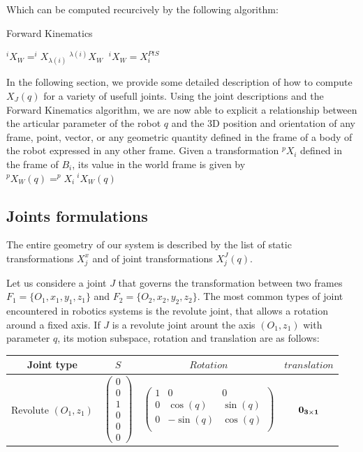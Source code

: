 Which can be computed recurcively by the following algorithm:

\begin{algorithm}
  \caption{Forward Kinematics}
  \label{FK}
\begin{algorithmic}
   $^iX_W = ^iX_{\lambda(i)}\ ^{\lambda(i)}X_W$
  \Else $\ ^iX_W = X^{PtS}_i$
  \EndIf
  \EndFor
\end{algorithmic}
\end{algorithm}

In the following section, we provide some detailed description of how to compute $X_J(q)$ for a variety of usefull joints.
Using the joint descriptions and the Forward Kinematics algorithm, we are now able to explicit a relationship between the articular parameter of the robot $q$ and the 3D position and orientation of any frame, point, vector, or any geometric quantity defined in the frame of a body of the robot expressed in any other frame.
Given a transformation $^pX_i$ defined in the frame of $B_i$, its value in the world frame is given by $^pX_W(q) = ^pX_i\ ^iX_W(q)$

\subsection{Joints formulations}
\label{sub:joints_formulations}

The entire geometry of our system is described by the list of static transformations $X^x_j$ and of joint transformations $X^J_j(q)$.

Let us considere a joint $J$ that governs the transformation between two frames $F_1=\{O_1, x_1, y_1, z_1\}$ and $F_2=\{O_2, x_2, y_2, z_2\}$.
The most common types of joint encountered in robotics systems is the revolute joint, that allows a rotation around a fixed axis.
If $J$ is a revolute joint arount the axis $(O_1,z_1)$ with parameter $q$, its motion subspace, rotation and translation are as follows:

\begin{tabular}{|c|c|c|c|}
  \hline
  Joint type & $S$ & $Rotation$ & $translation$ \\
  \hline
  Revolute $(O_1,z_1)$
  &
  $\begin{pmatrix}
    0 \\ 0 \\ 1 \\ 0 \\ 0 \\ 0
  \end{pmatrix}$
  &
  $\begin{pmatrix}
    1 & 0 & 0 \\
    0 & \cos(q) & \sin(q) \\
    0 & -\sin(q) & \cos(q) \\
  \end{pmatrix}$
  &
  $\bf{0}_{3\times1}$
  \\
  \hline
\end{tabular}

